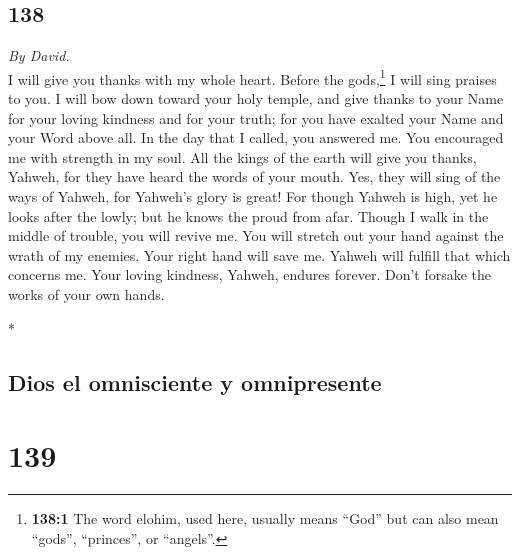 \begin{paracol}{2}
\switchcolumn
\begin{otherlanguage}{english}

\hypertarget{section-275}{%
\section{138}\label{section-275}}

\emph{By David.}\\
 I will give you thanks with my whole heart. Before the
gods,\footnote{\textbf{138:1} The word elohim, used here, usually means
  ``God'' but can also mean ``gods'', ``princes'', or ``angels''.} I
will sing praises to you.  I will bow down toward your
holy temple, and give thanks to your Name for your loving kindness and
for your truth; for you have exalted your Name and your Word above all.
 In the day that I called, you answered me. You encouraged
me with strength in my soul.  All the kings of the earth
will give you thanks, Yahweh, for they have heard the words of your
mouth.  Yes, they will sing of the ways of Yahweh, for
Yahweh's glory is great!  For though Yahweh is high, yet
he looks after the lowly; but he knows the proud from afar.
 Though I walk in the middle of trouble, you will revive
me. You will stretch out your hand against the wrath of my enemies. Your
right hand will save me.  Yahweh will fulfill that which
concerns me. Your loving kindness, Yahweh, endures forever. Don't
forsake the works of your own hands.

\end{otherlanguage}

\switchcolumn[0]*

\hypertarget{dios-el-omnisciente-y-omnipresente}{%
\subsection{Dios el omnisciente y
omnipresente}\label{dios-el-omnisciente-y-omnipresente}}

\hypertarget{section-276}{%
\section{139}\label{section-276}}


\end{paracol}
